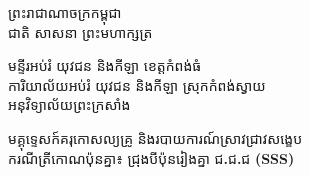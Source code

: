 \documentclass[a4paper,12pt]{article}
\newcommand{\enbf}[1]{{\TimesEn\textbf{#1}}}
\newcommand{\khmflourish}{{\Tacteing\fontsize{38pt}{15pt}\selectfont\raisebox{-5pt}{3}}}
\newcommand{\parttitle}[1]{{\muol\fontsize{13pt}{17pt}\selectfont #1}}
\begin{document}
\thispagestyle{firstpage}
\fontsize{11.5pt}{14.92pt}\selectfont
\vspace*{-0.75cm}

\begin{center}
  {\muol\fontsize{13pt}{18pt}\selectfont ព្រះរាជាណាចក្រកម្ពុជា}\\[2pt]
  {\muol\fontsize{12pt}{17pt}\selectfont ជាតិ សាសនា ព្រះមហាក្សត្រ}\\[1pt]
  \khmflourish
\end{center}

\vspace{-12pt}
{\muol\fontsize{10.8pt}{15.5pt}\selectfont
មន្ទីរអប់រំ យុវជន និងកីឡា ខេត្តកំពង់ធំ\\
ការិយាល័យអប់រំ យុវជន និងកីឡា ស្រុកកំពង់ស្វាយ\\
អនុវិទ្យាល័យព្រះក្រសាំង}

\vspace{6pt}
\begin{center}
  \parttitle{មគ្គុទ្ទេសក៍គរុកោសល្យគ្រូ និងរបាយការណ៍ស្រាវជ្រាវសង្ខេប}\\[3pt]
  {\muol\fontsize{11.5pt}{16.5pt}\selectfont ករណីត្រីកោណប៉ុនគ្នា៖ ជ្រុងបីប៉ុនរៀងគ្នា ជ\enbf{.}ជ\enbf{.}ជ \enbf{(SSS)}}
\end{center}

\vspace{4pt}
\end{document}
